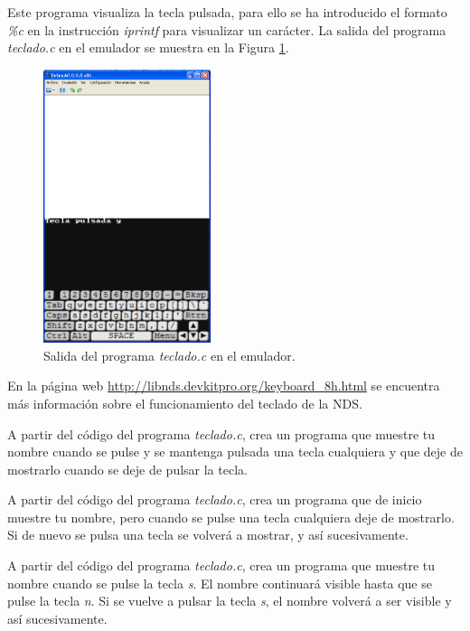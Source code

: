 Este programa visualiza la tecla pulsada, para ello se ha introducido el formato \textit{\%c} en la instrucción \textit{iprintf} para visualizar un carácter. La salida del programa \textit{teclado.c} en el emulador se muestra en la Figura \ref{fig_c3_teclado1}.

\begin{figure}[t]
\centering
\includegraphics[height=8cm]{Figuras/C3/c3_teclado1.png}
\caption{Salida del programa \textit{teclado.c} en el emulador.}
\label{fig_c3_teclado1}
\end{figure}

En la página web \url{http://libnds.devkitpro.org/keyboard_8h.html} se encuentra más información sobre el funcionamiento del teclado de la NDS.


\begin{exercise}
A partir del código del programa \textit{teclado.c}, crea un programa que muestre tu nombre cuando se pulse y se mantenga pulsada una tecla cualquiera y que deje de mostrarlo cuando se deje de pulsar la tecla.
\end{exercise}

\begin{exercise}
A partir del código del programa \textit{teclado.c}, crea un programa que de inicio muestre tu nombre, pero cuando se pulse una tecla cualquiera deje de mostrarlo. Si de nuevo se pulsa una tecla se volverá a mostrar, y así sucesivamente.
\end{exercise}

\begin{exercise}
A partir del código del programa \textit{teclado.c}, crea un programa que muestre tu nombre cuando se pulse la tecla \textit{s}. El nombre continuará visible hasta que se pulse la tecla \textit{n}. Si se vuelve a pulsar la tecla \textit{s}, el nombre volverá a ser visible y así sucesivamente.
\end{exercise}

